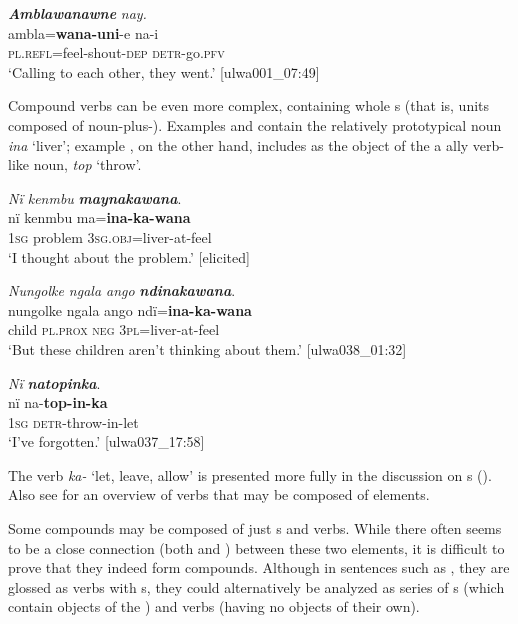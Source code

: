 \ea%
    \label{ex:verbs:102}
          \textbf{\textit{Amblawanawne}} \textit{nay.}\\
\gll    ambla=\textbf{wana-uni}{}-e    na-i\\
    \textsc{pl.refl}=feel-shout\textsc{{}-dep}  \textsc{detr}{}-go.\textsc{pfv}\\
\glt `Calling to each other, they went.’ [ulwa001\_07:49]
\z

Compound verbs can be even more complex, containing whole s (that is, units composed of noun-plus-). Examples  and  contain the relatively prototypical noun \textit{ina} ‘liver’; example , on the other hand, includes as the object of the  a ally verb-like noun, \textit{top} ‘throw’.

\ea%
    \label{ex:verbs:103}
          \textit{Nï kenmbu} \textbf{\textit{maynakawana}}.\\
\gll nï    kenmbu  ma=\textbf{ina-ka-wana}\\
    1\textsc{sg}  problem  \textsc{3sg.obj}=liver-at-feel\\
\glt `I thought about the problem.’ [elicited]
\z

\ea%
    \label{ex:verbs:104}
          \textit{Nungolke ngala ango} \textbf{\textit{ndinakawana}}.\\
\gll nungolke  ngala    ango  ndï=\textbf{ina-ka-wana}\\
    child    \textsc{pl.prox}  \textsc{neg}  3\textsc{pl}=liver-at-feel\\
\glt `But these children aren’t thinking about them.’ [ulwa038\_01:32]
\z

\ea%
    \label{ex:verbs:105}
          \textit{Nï} \textbf{\textit{natopinka}}.\\
\gll nï    na-\textbf{top-in-ka}\\
    1\textsc{sg}  \textsc{detr}{}-throw-in-let\\
\glt `I’ve forgotten.’ [ulwa037\_17:58]
\z

The verb \textit{ka-} ‘let, leave, allow’ is presented more fully in the discussion on s (). Also see  for an overview of  verbs that may be composed of  elements.

  Some compounds may be composed of just s and verbs. While there often seems to be a close connection (both  and ) between these two elements, it is difficult to prove that they indeed form compounds. Although in sentences such as , they are glossed as   verbs with s, they could alternatively be analyzed as series of s (which contain objects of the ) and  verbs (having no objects of their own).

